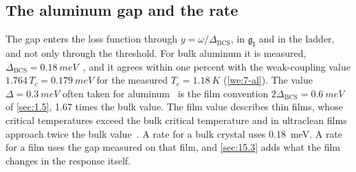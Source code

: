 \subsection{The aluminum gap and the rate}\label{sec:15.1-al}

The gap enters the loss function through $y = \omega/\Delta_{\mathrm{BCS}}$, in $\mathfrak{g}_{\mathrm{I}}$ and in the ladder, and not only through the threshold. For bulk aluminum it is measured, $\Delta_{\mathrm{BCS}} = \SI{0.18}{meV}$~\cite[Table~III]{savrasov1996electron}, and it agrees within one percent with the weak-coupling value $1.764\,T_c = \SI{0.179}{meV}$ for the measured $T_c = \SI{1.18}{K}$ (\cref{we:7-al}). The value $\Delta = \SI{0.3}{meV}$ often taken for aluminum~\cite[p.~2]{hochberg2023directional} is the film convention $2\Delta_{\mathrm{BCS}} = \SI{0.6}{meV}$ of \cref{sec:1.5}, 1.67 times the bulk value. The film value describes thin films, whose critical temperatures exceed the bulk critical temperature and in ultraclean films approach twice the bulk value~\cite{yeh2023doubling}. A rate for a bulk crystal uses \SI{0.18}{meV}. A rate for a film uses the gap measured on that film, and \cref{sec:15.3} adds what the film changes in the response itself.

